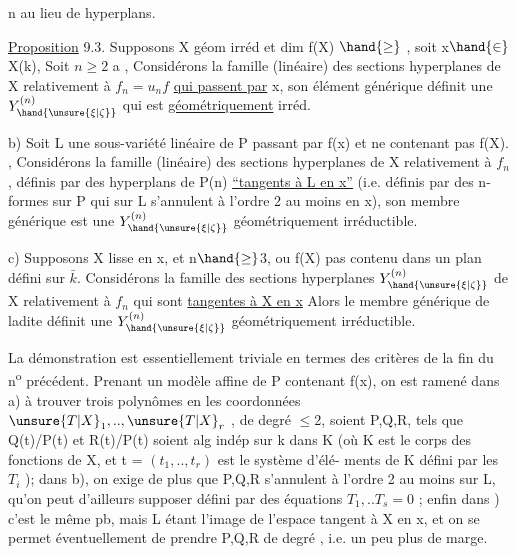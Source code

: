 
n  au lieu de  hyperplans.

\uline{Proposition} 9.3.  Supposons X géom irréd et dim f(X) $\hand{\geq}$ ,  soit x$\hand{\in}$X(k), Soit $n\geq 2$ 
 a\hand{)} , Considérons la famille (linéaire) des sections hyperplanes
de X relativement à $f_n=u_nf$ \uline{qui passent par} x, son élément
générique  définit une $Y^{(n)}_{\hand{\unsure{\xi|\zeta}}}$ qui est \uline{géométriquement} irréd.

b) 
 Soit L une sous-variété linéaire de P passant par f(x) et
ne contenant pas f(X). , Considérons la famille (linéaire) des
sections hyperplanes de X relativement à  $f_n$  , définis
par des hyperplans de P(n)  \uline{``tangents à L en x''} (i.e. définis
par des n-formes sur P qui sur L s'annulent à l'ordre 2 au moins en x), son
membre générique  est une $Y^{(n)}_{\hand{\unsure{\xi|\zeta}}}$ géométriquement irréductible.

c) Supposons X lisse en x,  et  n$\hand{\geq}$3, ou f(X) pas contenu dans un plan défini sur $\bar{k}$.  Considérons
la famille des sections hyperplanes   $Y^{(n)}_{\hand{\unsure{\xi|\zeta}}}$ de X relativement
à $f_n$ qui sont \uline{tangentes à X en x}\unsure{,} Alors le membre générique de ladite
définit une $Y^{(n)}_{\hand{\unsure{\xi|\zeta}}}$ géométriquement irréductible.

La démonstration est essentiellement triviale en termes des
critères de la fin du n\textsuperscript{o} précédent. Prenant un modèle affine de P
contenant f(x), on est ramené dans a) à trouver  trois polynômes
en les coordonnées $\unsure{T|X}_1,..,\unsure{T|X}_r$ , de degré $\leq$2, soient P,Q,R, tels que
Q(t)/P(t) et R(t)/P(t) soient alg indép sur k dans K (où K est le
corps des fonctions de X, et t = $(t_1,..,t_r)$ est le système d'élé-%
ments de K défini par les $T_i$ ); dans b), on exige de plus que P,Q,R
s'annulent à l'ordre 2 au moins sur L, qu'on peut d'ailleurs supposer
défini par des équations $T_1,..T_s = 0$ ; enfin dans ) c'est le même
pb, mais L étant l'image de l'espace tangent à X en x, et on se permet
éventuellement de prendre P,Q,R  de degré  , i.e. un peu plus de marge.

